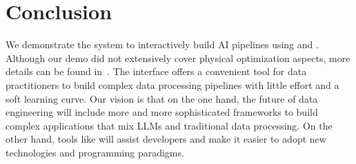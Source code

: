 \section{Conclusion}
\label{sec:conclusion}
We demonstrate the \chat{} system to interactively build AI pipelines using \sys{} and \archytas{}.
Although our demo did not extensively cover physical optimization aspects, more details can be found in~\cite{palimpzestCIDR}.
The \chat{} interface offers a convenient tool for data practitioners to build complex data processing pipelines with little effort and a soft learning curve.
Our vision is that on the one hand, the future of data engineering will include more and more sophisticated frameworks to build complex applications that mix LLMs and traditional data processing.
On the other hand, tools like \chat{} will assist developers and make it easier to adopt new technologies and programming paradigms.
